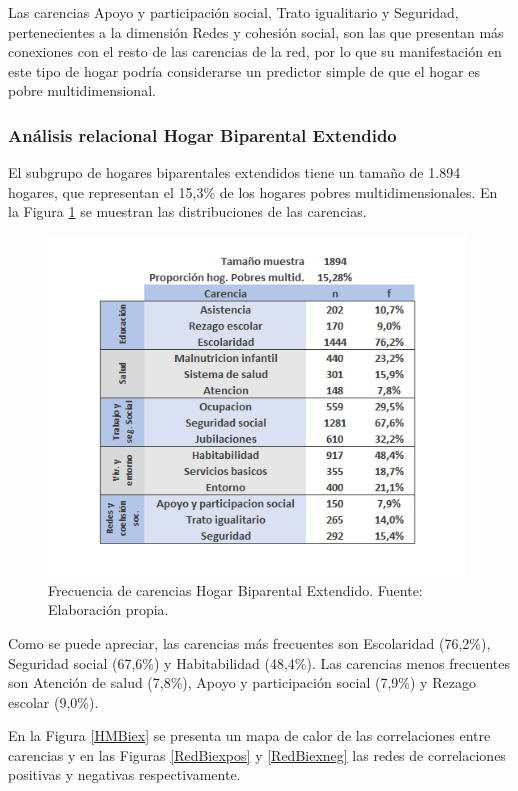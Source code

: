 \documentclass[12pt,letterpaper,spanish]{article}
\begin{document}
Las carencias Apoyo y participación social, Trato igualitario y Seguridad, pertenecientes a la dimensión Redes y cohesión social, son las que presentan más conexiones con el resto de las carencias de la red, por lo que su manifestación en este tipo de hogar podría considerarse un predictor simple de que el hogar es pobre multidimensional.


\subsubsection{Análisis relacional Hogar Biparental Extendido}

El subgrupo de hogares biparentales extendidos tiene un tamaño de 1.894 hogares, que representan el 15,3\% de los hogares pobres multidimensionales. En la Figura \ref{freBiex} se muestran las distribuciones de las carencias.

\begin{figure}[H]
  \centering
    \includegraphics[height=9cm]{HOGARES/tabla_biex.png}
    \caption{Frecuencia de carencias Hogar Biparental Extendido. Fuente: Elaboración propia.}
    \label{freBiex}
\end{figure}

Como se puede apreciar, las carencias más frecuentes son Escolaridad (76,2\%), Seguridad social (67,6\%) y Habitabilidad (48,4\%). Las carencias menos frecuentes son Atención de salud (7,8\%), Apoyo y participación social (7,9\%) y Rezago escolar (9,0\%).

En la Figura \ref{HMBiex} se presenta un mapa de calor de las correlaciones entre carencias y en las Figuras \ref{RedBiexpos} y \ref{RedBiexneg} las redes de correlaciones positivas y negativas respectivamente.
\end{document}
